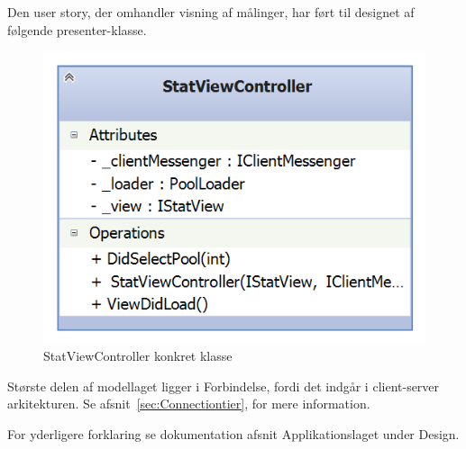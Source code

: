 Den user story, der omhandler visning af målinger, har ført til designet af følgende presenter-klasse.

\begin{figure}
\centering
\includegraphics[width=0.35\linewidth]{figs/design/application_statviewcontroller}
\caption{StatViewController konkret klasse}
\label{fig:application_statviewcontroller}
\end{figure}

Største delen af modellaget ligger i Forbindelse, fordi det indgår i client-server arkitekturen. Se afsnit~\ref{sec:Connectiontier}, for mere information.

For yderligere forklaring se dokumentation afsnit Applikationslaget under Design.